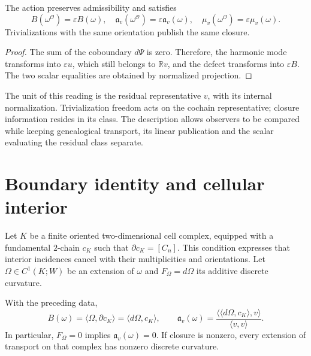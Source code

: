 \begin{proposition}
\label{x_reciprocidad:vii:prop:observador-covarianza}
The action preserves admissibility and satisfies
\[
 B(\omega^{\mathcal O})=\varepsilon B(\omega),\quad
 \mathfrak a_v(\omega^{\mathcal O})=\varepsilon\mathfrak a_v(\omega),
 \quad \mu_v(\omega^{\mathcal O})=\varepsilon\mu_v(\omega).
\]
Trivializations with the same orientation publish the same closure.
\end{proposition}

\begin{proof}
The sum of the coboundary \(d\Psi\) is zero. Therefore, the harmonic mode
transforms into \(\varepsilon u\), which still belongs to
\(\mathbb Rv\), and the defect transforms into \(\varepsilon B\).
The two scalar equalities are obtained by normalized projection.
\end{proof}

The unit of this reading is the residual representative \(v\), with its
internal normalization. Trivialization freedom acts on the
cochain representative; closure information resides in its
class. The description allows observers to be compared while keeping
genealogical transport, its linear publication and the scalar
evaluating the residual class separate.

\section{Boundary identity and cellular interior}
\label{x_reciprocidad:vii:sec:observador-stokes}

Let \(K\) be a finite oriented two-dimensional cell complex,
equipped with a fundamental \(2\)-chain \(c_K\) such that
\(\partial c_K=[C_n]\). This condition expresses that interior
incidences cancel with their multiplicities and orientations.
Let \(\Omega\in C^1(K;W)\) be an extension of \(\omega\) and
\(F_\Omega=d\Omega\) its additive discrete curvature.

\begin{theorem}
\label{x_reciprocidad:vii:thm:observador-stokes}
With the preceding data,
\begin{equation}
 B(\omega)=\langle\Omega,\partial c_K\rangle
          =\langle d\Omega,c_K\rangle,
 \qquad
 \mathfrak a_v(\omega)
 =\frac{\langle\langle d\Omega,c_K\rangle,v\rangle}
        {\langle v,v\rangle}.
 \label{x_reciprocidad:vii:eq:observador-stokes}
\end{equation}
In particular, \(F_\Omega=0\) implies \(\mathfrak a_v(\omega)=0\).
If closure is nonzero, every extension of transport on that complex
has nonzero discrete curvature.
\end{theorem}

